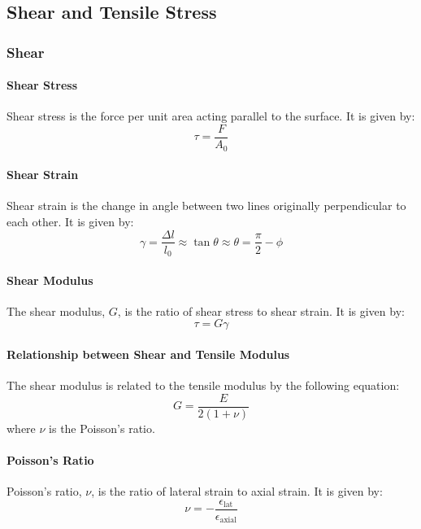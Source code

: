 \documentclass[11pt]{article}
\begin{document}
\subsection{Shear and Tensile Stress}
\subsubsection{Shear}
\paragraph{Shear Stress} Shear stress is the force per unit area acting parallel to the surface. It is given by:
\begin{equation}
    \tau = \frac{F}{A_0}
\end{equation}
\paragraph{Shear Strain} Shear strain is the change in angle between two lines originally perpendicular to each other. It is given by:
\begin{equation}
    \gamma = \frac{\Delta l}{l_0} \approx \tan \theta \approx \theta = \frac{\pi}{2} - \phi
\end{equation}
\paragraph{Shear Modulus} The shear modulus, $G$, is the ratio of shear stress to shear strain. It is given by:
\begin{equation}
    \tau = G \gamma
\end{equation}
\paragraph{Relationship between Shear and Tensile Modulus} The shear modulus is related to the tensile modulus by the following equation:
\begin{equation}
    G = \frac{E}{2(1+\nu)}
\end{equation}
where $\nu$ is the Poisson's ratio.
\paragraph{Poisson's Ratio} Poisson's ratio, $\nu$, is the ratio of lateral strain to axial strain. It is given by:
\begin{equation}
    \nu = -\frac{\epsilon_{\text{lat}}}{\epsilon_{\text{axial}}}
\end{equation}
\end{document}
